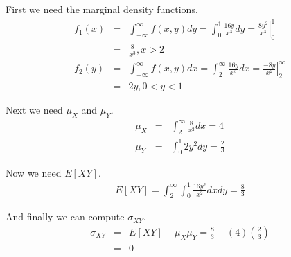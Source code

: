\documentclass{article}
\begin{document}
First we need the marginal density functions.
\begin{eqnarray*}
f_1(x) & = & \int_{-\infty}^{\infty} f(x,y)dy = \int_0^1 \frac{16y}{x^3}dy
	= \left.\frac{8y^2}{x^3}\right|_0^1\\
	& = & \frac{8}{x^3}, x>2\\
f_2(y) & = & \int_{-\infty}^{\infty} f(x,y)dx = \int_2^\infty \frac{16y}{x^3}dx
	= \left.\frac{-8y}{x^2}\right|_2^\infty\\
	& = & 2y, 0<y<1
\end{eqnarray*}

Next we need $\mu_X$ and $\mu_Y$.
\begin{eqnarray*}
\mu_X & = & \int_2^\infty \frac{8}{x^2}dx = 4\\
\mu_Y & = & \int_0^1 2y^2dy = \frac{2}{3}
\end{eqnarray*}

Now we need $E[XY]$.
\begin{eqnarray*}
E[XY] = \int_2^\infty \int_0^1 \frac{16y^2}{x^2}dxdy = \frac{8}{3}
\end{eqnarray*}

And finally we can compute $\sigma_{XY}$.
\begin{eqnarray*}
\sigma_{XY} & = & E[XY]-\mu_X\mu_Y = \frac{8}{3}-(4)\left(\frac{2}{3}\right)\\
	 & = & \boxed{0}
\end{eqnarray*}
\end{document}
